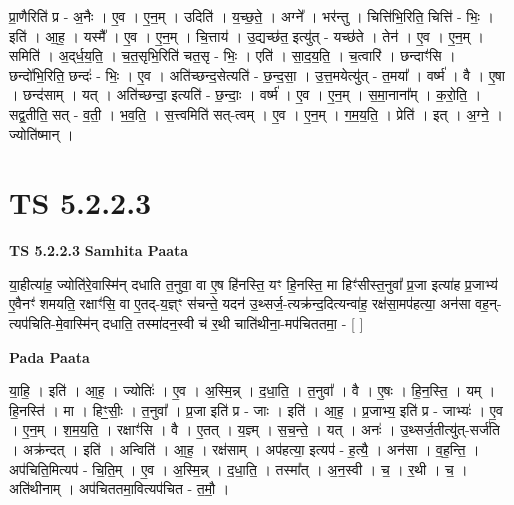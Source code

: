 \documentclass[17pt]{extarticle}
\begin{document}
प्रा॒णैरिति॑ प्र - अ॒नैः । ए॒व । ए॒न॒म् । उदिति॑ । य॒च्छ॒ते॒ । अग्ने᳚ । भर॑न्तु । चित्ति॑भि॒रिति॒ चित्ति॑ - भिः॒ । इति॑ । आ॒ह॒ । यस्मै᳚ । ए॒व । ए॒न॒म् । चि॒त्ताय॑ । उ॒द्यच्छ॑त॒ इत्यु॑त् - यच्छ॑ते । तेन॑ । ए॒व । ए॒न॒म् । समिति॑ । अ॒द्‌र्ध॒य॒ति॒ । च॒त॒सृभि॒रिति॑ चत॒सृ - भिः॒ । एति॑ । सा॒द॒य॒ति॒ । च॒त्वारि॑ । छन्दाꣳ॑सि । छन्दो॑भि॒रिति॒ छन्दः॑ - भिः॒ । ए॒व । अति॑च्छन्द॒सेत्यति॑ - छ॒न्द॒सा॒ । उ॒त्त॒मयेत्यु॑त् - त॒मया᳚ । वर्ष्म॑ । वै । ए॒षा । छन्द॑साम् । यत् । अति॑च्छन्दा॒ इत्यति॑ - छ॒न्दाः॒ । वर्ष्म॑ । ए॒व । ए॒न॒म् । स॒मा॒नाना᳚म् । क॒रो॒ति॒ । सद्व॒तीति॒ सत् - व॒ती॒ । भ॒व॒ति॒ । स॒त्त्वमिति॑ सत्-त्वम् । ए॒व । ए॒न॒म् । ग॒म॒य॒ति॒ । प्रेति॑ । इत् । अ॒ग्ने॒ । ज्योति॑ष्मान् ।  \newline




\section*{ TS 5.2.2.3 }

\textbf{TS 5.2.2.3 } \newline
\textbf{Samhita Paata} \newline

या॒हीत्या॑ह॒ ज्योति॑रे॒वास्मि॑न् दधाति त॒नुवा॒ वा ए॒ष हि॑नस्ति॒ यꣳ हि॒नस्ति॒ मा हिꣳ॑सीस्त॒नुवा᳚ प्र॒जा इत्या॑ह प्र॒जाभ्य॑ ए॒वैनꣳ॑ शमयति॒ रक्षाꣳ॑सि॒ वा ए॒तद्-य॒ज्ञ्ꣳ स॑चन्ते॒ यदन॑ उ॒थ्सर्ज॒-त्यक्र॑न्द॒दित्यन्वा॑ह॒ रक्ष॑सा॒मप॑हत्या॒ अन॑सा वह॒न्-त्यप॑चिति-मे॒वास्मि॑न् दधाति॒ तस्मा॑दन॒स्वी च॑ र॒थी चाति॑थीना॒-मप॑चिततमा॒ - [  ] \newline

\textbf{Pada Paata} \newline

या॒हि॒ । इति॑ । आ॒ह॒ । ज्योतिः॑ । ए॒व । अ॒स्मि॒न्न् । द॒धा॒ति॒ । त॒नुवा᳚ । वै । ए॒षः । हि॒न॒स्ति॒ । यम् । हि॒नस्ति॑ । मा । हिꣳ॒॒सीः॒ । त॒नुवा᳚ । प्र॒जा इति॑ प्र - जाः । इति॑ । आ॒ह॒ । प्र॒जाभ्य॒ इति॑ प्र - जाभ्यः॑ । ए॒व । ए॒न॒म् । श॒म॒य॒ति॒ । रक्षाꣳ॑सि । वै । ए॒तत् । य॒ज्ञ्म् । स॒च॒न्ते॒ । यत् । अनः॑ । उ॒थ्सर्ज॒तीत्यु॑त्-सर्ज॑ति । अक्र॑न्दत् । इति॑ । अन्विति॑ । आ॒ह॒ । रक्ष॑साम् । अप॑हत्या॒ इत्यप॑ - ह॒त्यै॒ । अन॑सा । व॒ह॒न्ति॒ । अप॑चिति॒मित्यप॑ - चि॒ति॒म् । ए॒व । अ॒स्मि॒न्न् । द॒धा॒ति॒ । तस्मा᳚त् । अ॒न॒स्वी । च॒ । र॒थी । च॒ । अति॑थीनाम् । अप॑चिततमा॒वित्यप॑चित - त॒मौ॒ ।  \newline




\end{document}
